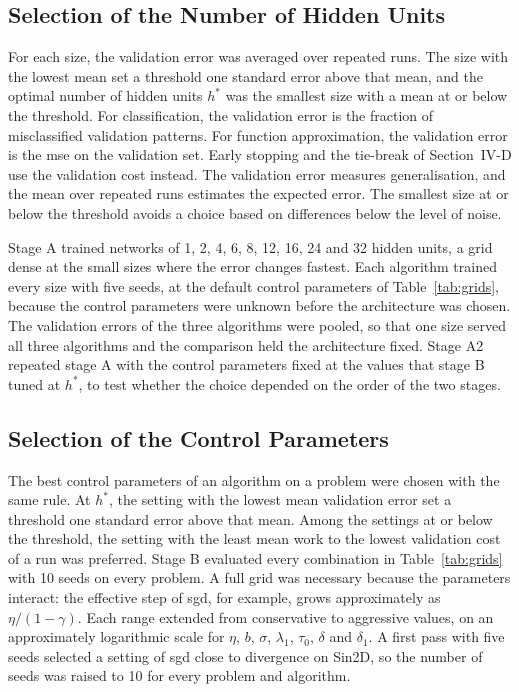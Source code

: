 \documentclass[conference]{IEEEtran}
\begin{document}
\subsection{Selection of the Number of Hidden Units}

For each size, the validation error was averaged over repeated runs. The size with
the lowest mean set a threshold one standard error above that mean, and the optimal
number of hidden units $h^*$ was the smallest size with a mean at or below the
threshold. For
classification, the validation error is the fraction of misclassified validation
patterns. For
function approximation, the validation error is the \gls{mse} on the validation set.
Early stopping and the tie-break of Section~IV-D use the validation cost instead.
The validation error measures generalisation, and the mean over repeated runs
estimates the expected error. The smallest size at or below the threshold avoids a choice
based on differences below the level of noise.

Stage A trained networks of 1, 2, 4, 6, 8, 12, 16, 24 and 32 hidden units, a grid
dense at the small sizes where the error changes fastest. Each algorithm trained
every size with five seeds, at the default control parameters of
Table~\ref{tab:grids}, because the control parameters were unknown before the
architecture was chosen. The validation errors of the three algorithms were
pooled, so that one size served all three algorithms and the comparison held the
architecture fixed. Stage A2 repeated stage A with the
control parameters fixed at the values that stage B tuned at $h^*$, to test
whether the choice depended on the order of the
two stages.

\subsection{Selection of the Control Parameters}

The best control parameters of an algorithm on a problem were chosen with the
same rule. At $h^*$, the setting with the lowest mean validation error set a
threshold one standard error above that mean. Among the settings at or below the
threshold, the setting with the least mean work to the lowest validation cost of a
run was preferred. Stage B evaluated every combination in
Table~\ref{tab:grids} with 10 seeds on every problem. A full grid was necessary because the
parameters interact: the effective step of \gls{sgd}, for example, grows
approximately as $\eta/(1-\gamma)$. Each range extended from conservative to
aggressive values, on an approximately logarithmic scale for $\eta$, $b$, $\sigma$,
$\lambda_1$, $\tau_0$, $\delta$ and $\delta_1$. A first pass with five seeds selected a setting of \gls{sgd} close to divergence on Sin2D,
so the number of seeds was raised to 10 for every problem and algorithm.
\end{document}
